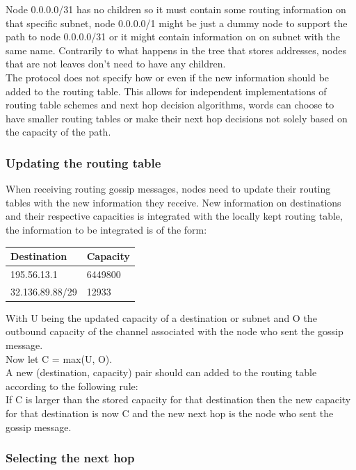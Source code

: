 Node 0.0.0.0/31 has no children so it must contain some routing information on that specific subnet, node 0.0.0.0/1 might be just a dummy node to support the path to node 0.0.0.0/31 or it might contain information on on subnet with the same name. Contrarily to what happens in the tree that stores addresses, nodes that are not leaves don't need to have any children. \\
The protocol does not specify how or even if the new information should be added to the routing table. This allows for independent implementations of routing table schemes and next hop decision algorithms, words can choose to have smaller routing tables or make their next hop decisions not solely based on the capacity of the path.

\subsubsection{Updating the routing table}
\label{sssec:updateroutingtable}

When receiving routing gossip messages, nodes need to update their routing tables with the new information they receive. New information on destinations and their respective capacities is integrated with the locally kept routing table, the information to be integrated is of the form:

\begin{table}[H]
\begin{tabular}{|l|l|}
\hline
\rowcolor[HTML]{C0C0C0} 
Destination     & Capacity \\ \hline
195.56.13.1     & 6449800  \\ \hline
32.136.89.88/29 & 12933    \\ \hline
\end{tabular}
\end{table}

With U being the updated capacity of a destination or subnet and O the outbound capacity of the channel associated with the node who sent the gossip message. \\
Now let C = max(U, O). \\
A new (destination, capacity) pair should can added to the routing table according to the following rule: \\
If C is larger than the stored capacity for that destination then the new capacity for that destination is now C and the new next hop is the node who sent the gossip message.

\subsubsection{Selecting the next hop}
\label{sssec:selectnexthop}

